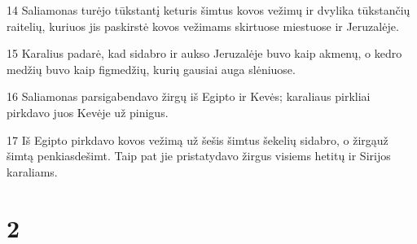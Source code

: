 \par 14 Saliamonas turėjo tūkstantį keturis šimtus kovos vežimų ir dvylika tūkstančių raitelių, kuriuos jis paskirstė kovos vežimams skirtuose miestuose ir Jeruzalėje. 
\par 15 Karalius padarė, kad sidabro ir aukso Jeruzalėje buvo kaip akmenų, o kedro medžių buvo kaip figmedžių, kurių gausiai auga slėniuose. 
\par 16 Saliamonas parsigabendavo žirgų iš Egipto ir Kevės; karaliaus pirkliai pirkdavo juos Kevėje už pinigus. 
\par 17 Iš Egipto pirkdavo kovos vežimą už šešis šimtus šekelių sidabro, o žirgą­už šimtą penkiasdešimt. Taip pat jie pristatydavo žirgus visiems hetitų ir Sirijos karaliams.


\chapter{2}


